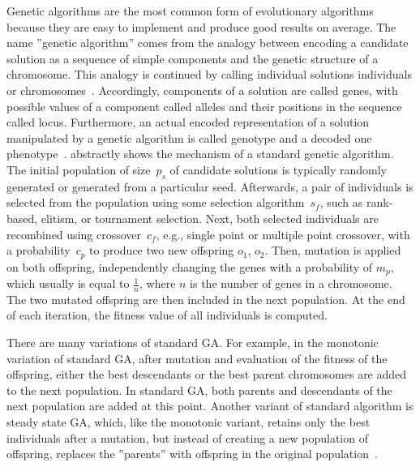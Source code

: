 \documentclass[paper=a4,%
  twoside,%
  BCOR4mm,%
  abstract=true,%
  toc=bibliography,%
  chapterprefix=true,%
  toc=bibliographynumbered,%
  open=right,%
  english,%
  pagesize=pdftex]{scrreprt}
\begin{document}
Genetic algorithms are the most common form of evolutionary algorithms because they are easy to implement and produce good results on average. The name ''genetic algorithm'' comes from the analogy between encoding a candidate solution as a sequence of simple components and the genetic structure of a chromosome. This analogy is continued by calling individual solutions individuals or chromosomes~\cite{Campos2017}. Accordingly, components of a solution are called genes, with possible values of a component called alleles and their positions in the sequence called locus. Furthermore, an actual encoded representation of a solution manipulated by a genetic algorithm is called genotype and a decoded one phenotype~\cite{McMinn_2004}.  abstractly shows the mechanism of a standard genetic algorithm. The initial population of size~$p_s$ of candidate solutions is typically randomly generated or generated from a particular seed. Afterwards, a pair of individuals is selected from the population using some selection algorithm~$s_f$, such as rank-based, elitism, or tournament selection. Next, both selected individuals are recombined using crossover~$c_f$, e.g., single point or multiple point crossover, with a probability~$c_p$ to produce two new offspring $o_1$, $o_2$. Then, mutation is applied on both offspring, independently changing the genes with a probability of $m_p$, which usually is equal to $\frac{1}{n}$, where $n$ is the number of genes in a chromosome. The two mutated offspring are then included in the next population. At the end of each iteration, the fitness value of all individuals is computed.  

There are many variations of standard \ac{GA}. For example, in the monotonic variation of standard \ac{GA}, after mutation and evaluation of the fitness of the offspring, either the best descendants or the best parent chromosomes are added to the next population. In standard \ac{GA}, both parents and descendants of the next population are added at this point. Another variant of standard algorithm is steady state \ac{GA}, which, like the monotonic variant, retains only the best individuals after a mutation, but instead of creating a new population of offspring, replaces the ''parents'' with offspring in the original population~\cite{Campos2017}.
\end{document}
